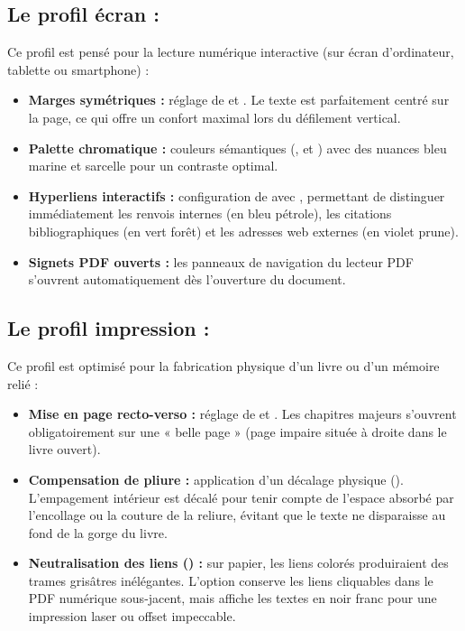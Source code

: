 \subsection{Le profil écran : }
Ce profil est pensé pour la lecture numérique interactive (sur écran d'ordinateur, tablette ou smartphone) :
\begin{itemize}
  \item \textbf{Marges symétriques :} réglage de  et .
  Le texte est parfaitement centré sur la page, ce qui offre un confort maximal lors du défilement vertical.
  \item \textbf{Palette chromatique :} couleurs sémantiques (,
   et )
  avec des nuances bleu marine et sarcelle pour un contraste optimal.
  \item \textbf{Hyperliens interactifs :} configuration de  avec ,
  permettant de distinguer immédiatement les renvois internes (en bleu pétrole), les citations bibliographiques (en vert forêt)
  et les adresses web externes (en violet prune).
  \item \textbf{Signets PDF ouverts :} les panneaux de navigation du lecteur PDF s'ouvrent automatiquement dès l'ouverture du document.
\end{itemize}

\subsection{Le profil impression : }
Ce profil est optimisé pour la fabrication physique d'un livre ou d'un mémoire relié :
\begin{itemize}
  \item \textbf{Mise en page recto-verso :} réglage de  et .
  Les chapitres majeurs s'ouvrent obligatoirement sur une « belle page » (page impaire située à droite dans le livre ouvert).
  \item \textbf{Compensation de pliure :} application d'un décalage physique ().
  L'empagement intérieur est décalé pour tenir compte de l'espace absorbé par l'encollage ou la couture de la reliure,
  évitant que le texte ne disparaisse au fond de la gorge du livre.
  \item \textbf{Neutralisation des liens () :} sur papier, les liens colorés produiraient des trames grisâtres inélégantes.
  L'option  conserve les liens cliquables dans le PDF numérique sous-jacent,
  mais affiche les textes en noir franc pour une impression laser ou offset impeccable.
\end{itemize}

